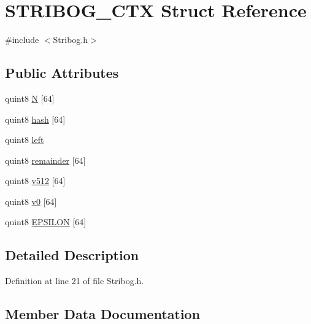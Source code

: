 \hypertarget{struct_s_t_r_i_b_o_g___c_t_x}{}\section{S\+T\+R\+I\+B\+O\+G\+\_\+\+C\+TX Struct Reference}
\label{struct_s_t_r_i_b_o_g___c_t_x}


{\ttfamily \#include $<$Stribog.\+h$>$}

\subsection*{Public Attributes}
\begin{DoxyCompactItemize}
\item 
quint8 \hyperlink{struct_s_t_r_i_b_o_g___c_t_x_ab4b648921d522543efdfb636c7805e06}{N} \mbox{[}64\mbox{]}
\item 
quint8 \hyperlink{struct_s_t_r_i_b_o_g___c_t_x_ae8b87703f2092fea7933af3ae36439b8}{hash} \mbox{[}64\mbox{]}
\item 
quint8 \hyperlink{struct_s_t_r_i_b_o_g___c_t_x_a79fac4804c3acbe9e9728165e30bca55}{left}
\item 
quint8 \hyperlink{struct_s_t_r_i_b_o_g___c_t_x_a7f48565f95a747f5f31c536c8e0d9a6f}{remainder} \mbox{[}64\mbox{]}
\item 
quint8 \hyperlink{struct_s_t_r_i_b_o_g___c_t_x_a82aa71d940ffadf7f4f3012295385892}{v512} \mbox{[}64\mbox{]}
\item 
quint8 \hyperlink{struct_s_t_r_i_b_o_g___c_t_x_a8dff93984b776eec14f39bb71eb00243}{v0} \mbox{[}64\mbox{]}
\item 
quint8 \hyperlink{struct_s_t_r_i_b_o_g___c_t_x_a8a204128ff9e6ed20b8d173fa6141e41}{E\+P\+S\+I\+L\+ON} \mbox{[}64\mbox{]}
\end{DoxyCompactItemize}


\subsection{Detailed Description}


Definition at line 21 of file Stribog.\+h.



\subsection{Member Data Documentation}
\mbox{\label{struct_s_t_r_i_b_o_g___c_t_x_a8a204128ff9e6ed20b8d173fa6141e41}} 
